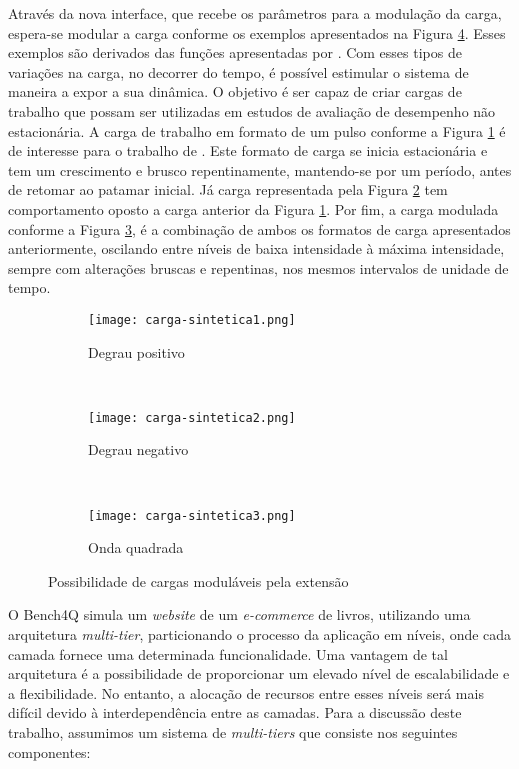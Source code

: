 Através da nova interface, que recebe os parâmetros para a modulação da carga, espera-se modular a carga conforme os exemplos apresentados na Figura \ref{fig:cargas-moduladas-exemplos}. Esses exemplos são derivados das funções apresentadas por . Com esses tipos de variações na carga, no decorrer do tempo, é possível estimular o sistema de maneira a expor a sua dinâmica. O objetivo é ser capaz de criar cargas de trabalho que possam ser utilizadas em estudos de avaliação de desempenho não estacionária. 
A carga de trabalho em formato de um pulso conforme a Figura \ref{fig:degrau-positivo} é de interesse para o trabalho de . Este formato de carga se inicia estacionária e tem um crescimento e brusco repentinamente, mantendo-se por um período, antes de retomar ao patamar inicial. Já carga representada pela Figura \ref{fig:degrau-negativo} tem comportamento oposto a carga anterior da Figura \ref{fig:degrau-positivo}. Por fim, a carga modulada conforme a Figura \ref{fig:onda-gradrada}, é a combinação de ambos os formatos de carga apresentados anteriormente, oscilando entre níveis de baixa intensidade à máxima intensidade, sempre com alterações bruscas e repentinas, nos mesmos intervalos de unidade de tempo.
 
\begin{figure}[!htb]
	\centering
	\begin{subfigure}[b]{0.35\textwidth}
		\texttt{[image: carga-sintetica1.png]}
		\caption{Degrau positivo}
		\label{fig:degrau-positivo}
	\end{subfigure}
	~
	\begin{subfigure}[b]{0.35\textwidth}
		\texttt{[image: carga-sintetica2.png]}
		\caption{Degrau negativo}
		\label{fig:degrau-negativo}
	\end{subfigure}
	~
	\begin{subfigure}[b]{0.35\textwidth}
		\texttt{[image: carga-sintetica3.png]}
		\caption{Onda quadrada}
		\label{fig:onda-gradrada}
	\end{subfigure}
	\caption{Possibilidade de cargas moduláveis pela extensão}
	\label{fig:cargas-moduladas-exemplos}
\end{figure}

O Bench4Q simula um \textit{website} de um \textit{e-commerce} de livros, utilizando uma arquitetura \textit{multi-tier}, particionando o processo da aplicação em níveis, onde cada camada fornece uma determinada funcionalidade. Uma vantagem de tal arquitetura é a possibilidade de proporcionar um elevado nível de escalabilidade e a flexibilidade. No entanto, a alocação de recursos entre esses níveis será mais difícil devido à interdependência entre as camadas. Para a discussão deste trabalho, assumimos um sistema de \textit{multi-tiers} que consiste nos seguintes componentes:

